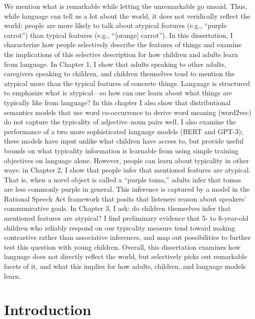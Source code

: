 \documentclass{ucetd}
\begin{document}
\abstract
We mention what is remarkable while letting the unremarkable go unsaid. Thus, while language can tell us a lot about the world, it does not veridically reflect the world: people are more likely to talk about atypical features (e.g., ``purple carrot'') than typical features (e.g., ``[orange] carrot''). In this dissertation, I characterize how people selectively describe the features of things and examine the implications of this selective description for how children and adults learn from language. In Chapter 1, I show that adults speaking to other adults, caregivers speaking to children, and children themselves tend to mention the atypical more than the typical features of concrete things. Language is structured to emphasize what is atypical—so how can one learn about what things are typically like from language? In this chapter I also show that distributional semantics models that use word co-occurrence to derive word meaning (word2vec) do not capture the typicality of adjective–noun pairs well. I also examine the performance of a two more sophisticated language models (BERT and GPT-3); these models have input unlike what children have access to, but provide useful bounds on what typicality information is learnable from using simple training objectives on language alone. However, people can learn about typicality in other ways: in Chapter 2, I show that people infer that mentioned features are atypical. That is, when a novel object is called a ``purple toma,'' adults infer that tomas are less commonly purple in general. This inference is captured by a model in the Rational Speech Act framework that posits that listeners reason about speakers' communicative goals. In Chapter 3, I ask: do children themselves infer that mentioned features are atypical? I find preliminary evidence that 5- to 6-year-old children who reliably respond on our typicality measure tend toward making contrastive rather than associative inferences, and map out possibilities to further test this question with young children. Overall, this dissertation examines how language does not directly reflect the world, but selectively picks out remarkable facets of it, and what this implies for how adults, children, and language models learn.

\mainmatter
\hypertarget{introduction}{%
\chapter*{Introduction}\label{introduction}}
\end{document}
